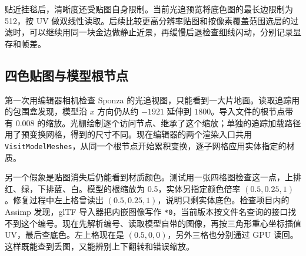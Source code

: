 贴近挂毯后，清晰度还受贴图自身限制。当前光追预览将底色图的最长边限制为 512，按 UV 做双线性读取。后续比较更高分辨率贴图和按像素覆盖范围选层的过滤时，可以继续用同一块金边做静止近景，再缓慢后退检查细线闪动，分别记录显存和帧差。

\subsection{四色贴图与模型根节点}
第一次用编辑器相机检查 Sponza 的光追视图，只能看到一大片地面。读取追踪用的包围盒发现，模型沿 $x$ 方向仍从约 $-1921$ 延伸到 $1800$。导入文件的根节点带有 0.008 的缩放。光栅绘制逐个访问节点、继承了这个缩放；单独的追踪加载路径用了预变换网格，得到的尺寸不同。现在编辑器的两个渲染入口共用 \texttt{VisitModelMeshes}，从同一个根节点开始累积变换，逐子网格应用实体指定的材质。

另一个假象是贴图消失后仍能看到材质颜色。测试用一张四格图检查这一点，上排红、绿，下排蓝、白。模型的根缩放为 0.5，实体另指定颜色倍率 $(0.5,0.25,1)$。修复过程中左上格曾读出 $(0.5,0.25,1)$，说明只剩实体底色。检查项目内的 Assimp 发现，glTF 导入器把内嵌图像写作 \texttt{*0}，当前版本按文件名查询的接口找不到这个编号。现在先解析编号、读取模型自带的图像，再按三角形重心坐标插值 UV，最后查底色。左上格现在是 $(0.5,0,0)$，另外三格也分别通过 GPU 读回。这样既能查到丢图，又能辨别上下翻转和错误缩放。
\endgroup
